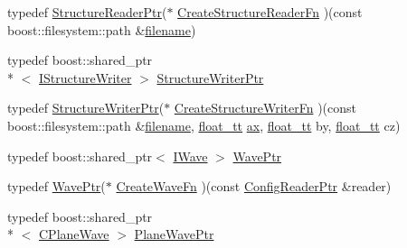 \begin{DoxyCompactItemize}
\item 
typedef \hyperlink{namespace_q_s_t_e_m_a3496fb9b2de0f3b3350f9b0d5206bc75}{Structure\-Reader\-Ptr}($\ast$ \hyperlink{namespace_q_s_t_e_m_a3bd4c40f6c26749ba931d19901e84255}{Create\-Structure\-Reader\-Fn} )(const boost\-::filesystem\-::path \&\hyperlink{write_fields2_file_8m_af3723aa817dbb65282d5e1db81f08ad8}{filename})
\item 
typedef boost\-::shared\-\_\-ptr\\*
$<$ \hyperlink{class_q_s_t_e_m_1_1_i_structure_writer}{I\-Structure\-Writer} $>$ \hyperlink{namespace_q_s_t_e_m_abd9ebd39703fa5559b437aa35900ef5c}{Structure\-Writer\-Ptr}
\item 
typedef \hyperlink{namespace_q_s_t_e_m_abd9ebd39703fa5559b437aa35900ef5c}{Structure\-Writer\-Ptr}($\ast$ \hyperlink{namespace_q_s_t_e_m_a410415444cab11e6e82ba838bacc0ca4}{Create\-Structure\-Writer\-Fn} )(const boost\-::filesystem\-::path \&\hyperlink{write_fields2_file_8m_af3723aa817dbb65282d5e1db81f08ad8}{filename}, \hyperlink{namespace_q_s_t_e_m_a915d7caa497280d9f927c4ce8d330e47}{float\-\_\-tt} \hyperlink{image_sim_8m_a8fa675eb2fcec5b95d9d21c670da7f30}{ax}, \hyperlink{namespace_q_s_t_e_m_a915d7caa497280d9f927c4ce8d330e47}{float\-\_\-tt} by, \hyperlink{namespace_q_s_t_e_m_a915d7caa497280d9f927c4ce8d330e47}{float\-\_\-tt} cz)
\item 
typedef boost\-::shared\-\_\-ptr$<$ \hyperlink{class_q_s_t_e_m_1_1_i_wave}{I\-Wave} $>$ \hyperlink{namespace_q_s_t_e_m_ab42c5fe058973736465964e84b504b74}{Wave\-Ptr}
\item 
typedef \hyperlink{namespace_q_s_t_e_m_ab42c5fe058973736465964e84b504b74}{Wave\-Ptr}($\ast$ \hyperlink{namespace_q_s_t_e_m_a50bc76f65725c2a74ed6a8c6e2fd6725}{Create\-Wave\-Fn} )(const \hyperlink{namespace_q_s_t_e_m_af9424707fe9f6503298f49b41304bd35}{Config\-Reader\-Ptr} \&reader)
\item 
typedef boost\-::shared\-\_\-ptr\\*
$<$ \hyperlink{class_q_s_t_e_m_1_1_c_plane_wave}{C\-Plane\-Wave} $>$ \hyperlink{namespace_q_s_t_e_m_a1bc6587692685d5942570cc15571fe14}{Plane\-Wave\-Ptr}
\end{DoxyCompactItemize}
